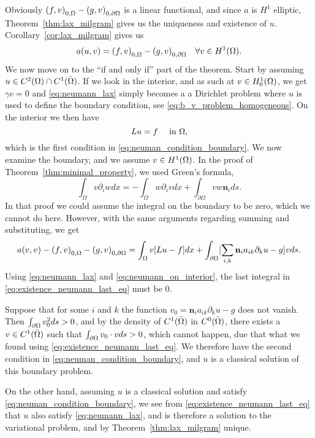 \begin{bev}
   Obviously $ {(f,v)}_{0,\Omega} - {(g,v)}_{0,\partial\Omega}$ is a linear functional, 
   and since $a$ is $H^1$ elliptic, Theorem~\ref{thm:lax_milgram} gives us the 
   uniqueness and existence of $u$.
   Corollary~\ref{cor:lax_milgram} gives us
   \begin{equation}
      a(u,v) = {(f,v)}_{0,\Omega} - {(g,v)}_{0,\partial\Omega} \quad \forall v \in H^1(\Omega). \label{eq:neumann_lax}
   \end{equation}
   We now move on to the ``if and only if'' part of the theorem. Start by 
   assuming $u \in C^2(\Omega)\cap C^1(\bar{\Omega})$.
   If we look in the interior, and as such at $v \in H^1_0(\Omega)$, we get $\gamma v=0$ 
   and \eqref{eq:neumann_lax} simply becomes a a Dirichlet problem where 
   $u$ is used to define the boundary condition, see \eqref{eq:b_v_problem_homogeneous}.
   On the interior we then have 
   \begin{equation}
    Lu = f \quad \text{ in }\Omega, \label{eq:neumann_on_interior}
   \end{equation} 
   which is the first condition in \eqref{eq:neuman_condition_boundary}.
   We now examine the boundary, and we assume $v\in H^1(\Omega)$.
   In the proof of Theorem~\ref{thm:minimal_property}, we used Green's formula,
    \begin{equation} %
        \int_\Omega v\partial_i w dx = -\int_\Omega w \partial_i v dx + \int_{\partial \Omega} v w \mathbf{n}_i ds.
    \end{equation}
   In that proof we could assume the integral on the boundary to be zero, which 
   we cannot do here. However, with the same arguments regarding summing and substituting, 
   we get
   \begin{equation}
      a(v,v) - {(f,v)}_{0,\Omega} - {(g,v)}_{0,\partial\Omega} = 
      \int_\Omega v[Lu - f] dx + \int_{\partial \Omega}
     [ \sum_{i,k}  \mathbf{n}_i a_{ik} \partial_k u-g]v ds.
     \label{eq:existence_neumann_last_eq}
   \end{equation}
   Using \eqref{eq:neumann_lax} and \eqref{eq:neumann_on_interior},
   the last integral in \eqref{eq:existence_neumann_last_eq} must be $0$.

   Suppose that for some $i$ and $k$ the function $v_0 = \mathbf{n}_i a_{ik} \partial_k u -g$ does 
   not vanish. Then $\int_{\partial\Omega}v_0^2ds>0$, and by the density of 
   $C^1(\bar{\Omega})$ in $C^0(\bar{\Omega})$, there exists a $v\in C^1(\bar{\Omega})$
   such that  $\int_{\partial\Omega}v_0\cdot vds>0$, which cannot happen, due that 
   what we found using \eqref{eq:existence_neumann_last_eq}. 
   We therefore have the second condition in \eqref{eq:neuman_condition_boundary},
   and $u$ is a classical solution of this boundary problem.

   On the other hand, assuming $u$ is a classical solution and satisfy \eqref{eq:neuman_condition_boundary},
   we see from \eqref{eq:existence_neumann_last_eq} that $u$ also satisfy 
   \eqref{eq:neumann_lax}, and is therefore a solution to the variational 
   problem, and by Theorem~\ref{thm:lax_milgram} unique.
\end{bev}